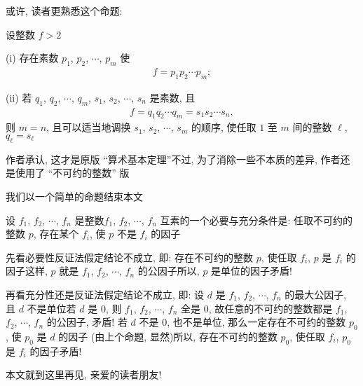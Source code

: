 \begin{remark}
    或许, 读者更熟悉这个命题:

    设整数 $f > 2$\period

    (i) 存在素数 $p_1$, $p_2$, $\cdots$, $p_m$ 使
    \begin{align*}
        f = p_1 p_2 \cdots p_m;
    \end{align*}

    (ii) 若 $q_1$, $q_2$, $\cdots$, $q_m$, $s_1$, $s_2$, $\cdots$, $s_n$ 是素数, 且
    \begin{align*}
        f = q_1 q_2 \cdots q_m = s_1 s_2 \cdots s_n,
    \end{align*}
    则 $m = n$, 且可以适当地调换 $s_1$, $s_2$, $\cdots$, $s_m$ 的顺序, 使任取 $1$ 至 $m$ 间的整数 $\ell$, $q_\ell = s_\ell$\period

    作者承认, 这才是原版 ``算术基本定理''\period 不过, 为了消除一些不本质的差异, 作者还是使用了 ``不可约的整数'' 版\period
\end{remark}

我们以一个简单的命题结束本文\period

\begin{proposition}
    设 $f_1$, $f_2$, $\cdots$, $f_n$ 是整数\period $f_1$, $f_2$, $\cdots$, $f_n$ 互素的一个必要与充分条件是: 任取不可约的整数 $p$, 存在某个 $f_i$, 使 $p$ 不是 $f_i$ 的因子\period
\end{proposition}

\begin{pf}
    先看必要性\period 反证法\period 假定结论不成立, 即: 存在不可约的整数 $p$, 使任取 $f_i$, $p$ 是 $f_i$ 的因子\period 这样, $p$ 就是 $f_1$, $f_2$, $\cdots$, $f_n$ 的公因子\period 所以, $p$ 是单位的因子\period 矛盾!

    再看充分性\period 还是反证法\period 假定结论不成立, 即: 设 $d$ 是 $f_1$, $f_2$, $\cdots$, $f_n$ 的最大公因子, 且 $d$ 不是单位\period 若 $d$ 是 $0$, 则 $f_1$, $f_2$, $\cdots$, $f_n$ 全是 $0$, 故任意的不可约的整数都是 $f_1$, $f_2$, $\cdots$, $f_n$ 的公因子, 矛盾! 若 $d$ 不是 $0$, 也不是单位, 那么一定存在不可约的整数 $p_0$, 使 $p_0$ 是 $d$ 的因子 (由上个命题, 显然)\period 所以, 存在不可约的整数 $p_0$, 使任取 $f_i$, $p_0$ 是 $f_i$ 的因子\period 矛盾!
\end{pf}

本文就到这里\period 再见, 亲爱的读者朋友!
